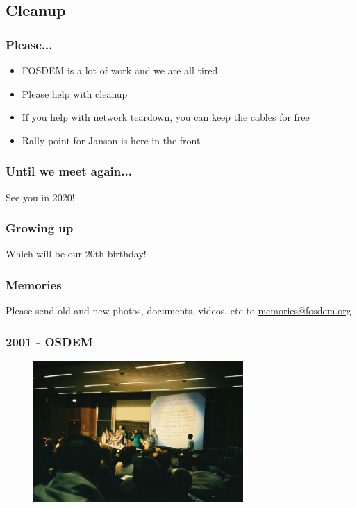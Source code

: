 \documentclass[aspectratio=169]{beamer}
\begin{document}
\subsection{Cleanup}

\begin{frame}
	\frametitle{Please...}
	\vfill
	\begin{itemize}
		\item FOSDEM is a lot of work and we are all tired
		\item Please help with cleanup
		\item If you help with network teardown, you can keep the cables for free
		\item Rally point for Janson is here in the front
	\end{itemize}
	\vfill
\end{frame}

\begin{frame}
	\frametitle{Until we meet again...}
	\vfill
	\begin{center}
		{\Huge See you in 2020!}
	\end{center}
	\vfill
\end{frame}

\begin{frame}
	\frametitle{Growing up}
	\vfill
	\begin{center}
		{\Huge Which will be our 20th birthday!}
	\end{center}
	\vfill
\end{frame}

\begin{frame}
	\frametitle{Memories}
	\vfill
	\begin{center}
		Please send old and new photos, documents, videos, etc to \url{memories@fosdem.org}
	\end{center}
	\vfill
\end{frame}

\begin{frame}
	\frametitle{2001 - OSDEM}
	\vfill
	\begin{figure}[ht!]
		\includegraphics[width=80mm]{images/2001_OSDEM.jpg}
	\end{figure}
	\vfill
\end{frame}
\end{document}
